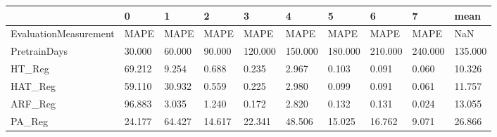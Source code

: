 \begin{tabular}{llllllllll}
\toprule
{} &      0 &      1 &      2 &       3 &       4 &       5 &       6 &       7 &    mean \\
\midrule
EvaluationMeasurement &   MAPE &   MAPE &   MAPE &    MAPE &    MAPE &    MAPE &    MAPE &    MAPE &     NaN \\
PretrainDays          & 30.000 & 60.000 & 90.000 & 120.000 & 150.000 & 180.000 & 210.000 & 240.000 & 135.000 \\
HT\_Reg                & 69.212 &  9.254 &  0.688 &   0.235 &   2.967 &   0.103 &   0.091 &   0.060 &  10.326 \\
HAT\_Reg               & 59.110 & 30.932 &  0.559 &   0.225 &   2.980 &   0.099 &   0.091 &   0.061 &  11.757 \\
ARF\_Reg               & 96.883 &  3.035 &  1.240 &   0.172 &   2.820 &   0.132 &   0.131 &   0.024 &  13.055 \\
PA\_Reg                & 24.177 & 64.427 & 14.617 &  22.341 &  48.506 &  15.025 &  16.762 &   9.071 &  26.866 \\
\bottomrule
\end{tabular}
